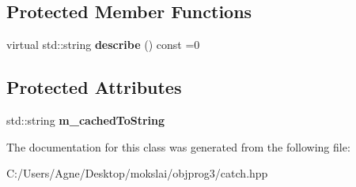 \subsection*{Protected Member Functions}
\begin{DoxyCompactItemize}
\item 
\mbox{\label{class_catch_1_1_matchers_1_1_impl_1_1_matcher_untyped_base_a91d3a907dbfcbb596077df24f6e11fe2}} 
virtual std\+::string {\bfseries describe} () const =0
\end{DoxyCompactItemize}
\subsection*{Protected Attributes}
\begin{DoxyCompactItemize}
\item 
\mbox{\label{class_catch_1_1_matchers_1_1_impl_1_1_matcher_untyped_base_a951095c462657e7097a9a6dc4dde813f}} 
std\+::string {\bfseries m\+\_\+cached\+To\+String}
\end{DoxyCompactItemize}


The documentation for this class was generated from the following file\+:\begin{DoxyCompactItemize}
\item 
C\+:/\+Users/\+Agne/\+Desktop/mokslai/objprog3/catch.\+hpp\end{DoxyCompactItemize}
